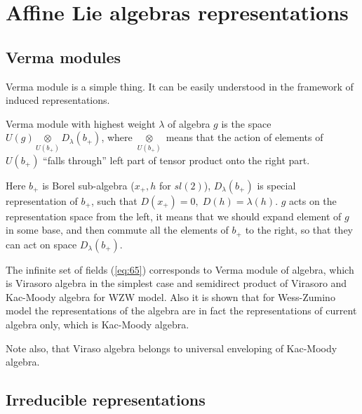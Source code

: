 \documentclass[a4paper,12pt]{article}
\theoremstyle{definition} \newtheorem{Def}{Definition}
\begin{document}
\section{Affine Lie algebras representations}
\label{sec:affine-lie-algebras}

\subsection{Verma modules}
\label{sec:verma-modules}

Verma module is a simple thing. It can be easily understood in the framework of induced representations. 

Verma module with highest weight $\lambda$ of algebra $g$ is the space $U(g)\underset{U(b_{+})}{\otimes} D_{\lambda}(b_{+})$, where $\underset{U(b_{+})}{\otimes}$ means that the action of elements of $U(b_{+})$ ``falls through'' left part of tensor product onto the right part.

Here $b_{+}$ is Borel sub-algebra ($x_{+},h$ for $sl(2)$), $D_{\lambda}(b_{+})$ is special representation of $b_{+}$, such that $D(x_{+})=0,\; D(h)=\lambda(h)$.
$g$ acts on the representation space from the left, it means that we should expand element of $g$ in some base, and then commute all the elements of $b_{+}$ to the right, so that they can act on space $D_{\lambda}(b_{+})$.



The infinite set of fields (\ref{eq:65}) corresponds to Verma module of algebra, which is Virasoro algebra in the simplest case and semidirect product of Virasoro and Kac-Moody algebra for WZW model. Also it is shown that for Wess-Zumino model the representations of the algebra are in fact the representations of current algebra only, which is Kac-Moody algebra.

Note also, that Viraso algebra belongs to universal enveloping of Kac-Moody algebra.

\subsection{Irreducible representations}
\label{sec:irred-repr}


{}

\end{document}
